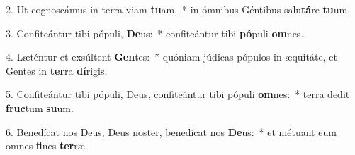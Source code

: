 2. Ut cognoscámus in terra viam \textbf{tu}am,~*  in ómnibus Géntibus salu\textbf{tá}re \textbf{tu}um.\

3. Confiteántur tibi pópuli, \textbf{De}us:~*  confiteántur tibi \textbf{pó}puli \textbf{om}nes.\

4. Læténtur et exsúltent \textbf{Gen}tes:~*  quóniam júdicas pópulos in æquitáte, et Gentes in \textbf{ter}ra \textbf{dí}rigis.\

5. Confiteántur tibi pópuli, Deus, confiteántur tibi pópuli \textbf{om}nes:~*  terra dedit \textbf{fruc}tum \textbf{su}um.\

6. Benedícat nos Deus, Deus noster, benedícat nos \textbf{De}us:~*  et métuant eum omnes \textbf{fi}nes \textbf{ter}ræ.\

